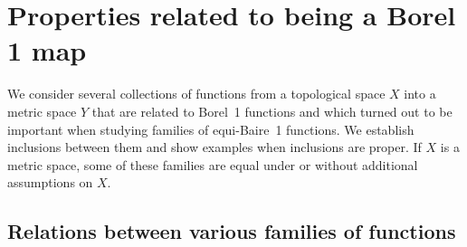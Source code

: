 \documentclass[a4paper]{amsart}
\theoremstyle{plain}
\theoremstyle{definition}
\theoremstyle{remark}
\numberwithin{equation}{section}
\begin{document}

\section{Properties related to being a Borel 1 map}	
\label{sec:properties}

We consider several collections of functions from a topological space $X$ into a metric space $Y$ that are related to Borel~1 functions and which turned out to be important when studying families of equi-Baire~1 functions.
We establish inclusions between them and show examples when inclusions are proper. If $X$ is a metric space, some of these families are equal under or without additional assumptions on $X$.
	\subsection{Relations between various families of functions}
	
\end{document}
